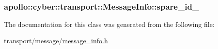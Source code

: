 \hypertarget{classapollo_1_1cyber_1_1transport_1_1MessageInfo_aac263f9a5ad9550b87af4b0284656c47}{
\subsubsection[{spare\-\_\-id\-\_\-}]{ apollo\-::cyber\-::transport\-::\-Message\-Info\-::spare\-\_\-id\-\_\-\hspace{0.3cm}{\ttfamily [private]}}}\label{classapollo_1_1cyber_1_1transport_1_1MessageInfo_aac263f9a5ad9550b87af4b0284656c47}


The documentation for this class was generated from the following file\-:\begin{DoxyCompactItemize}
\item 
transport/message/\hyperlink{message__info_8h}{message\-\_\-info.\-h}\end{DoxyCompactItemize}
